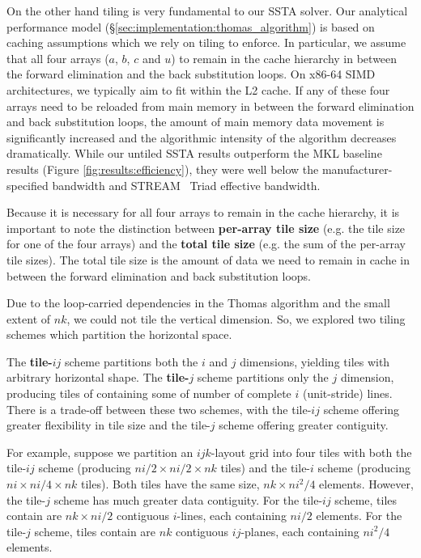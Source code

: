 \documentclass{sig-alternate-05-2015}
\begin{document}
On the other hand tiling is very fundamental to our SSTA solver.
Our analytical performance model (\S\ref{sec:implementation:thomas_algorithm})
  is based on caching assumptions which we rely on tiling to enforce.
In particular, we assume that all four arrays (\(a\), \(b\), \(c\) and \(u\))
  to remain in the cache hierarchy in between the forward elimination and the
  back substitution loops.
On x86-64 SIMD architectures, we typically aim to fit within the L2 cache.
If any of these four arrays need to be reloaded from main memory in between the
  forward elimination and back substitution loops, the amount of main memory data
  movement is significantly increased and the algorithmic intensity of the
  algorithm decreases dramatically.
While our untiled SSTA results outperform the MKL baseline results (Figure
  \ref{fig:results:efficiency}), they were well below the manufacturer-specified
  bandwidth and STREAM~\cite{stream} Triad effective bandwidth.

Because it is necessary for all four arrays to remain in the cache hierarchy, 
  it is important to note the distinction between \textbf{per-array tile size}
  (e.g. the tile size for one of the four arrays) and the
  \textbf{total tile size} (e.g. the sum of the per-array tile sizes).
The total tile size is the amount of data we need to remain in cache in between
  the forward elimination and back substitution loops.


Due to the loop-carried dependencies in the Thomas algorithm and the small
  extent of \(nk\), we could not tile the vertical dimension. So, we explored two
  tiling schemes which partition the horizontal space.

The \textbf{tile-\(ij\)} scheme partitions both the \(i\) and \(j\) dimensions,
  yielding tiles with arbitrary horizontal shape. 
The \textbf{tile-\(j\)} scheme partitions only the \(j\) dimension, producing
  tiles of containing some of number of complete \(i\) (unit-stride) lines.
There is a trade-off between these two schemes, with the tile-\(ij\) scheme
  offering greater flexibility in tile size and the tile-\(j\) scheme offering
  greater contiguity. 

For example, suppose we partition an \(ijk\)-layout grid into four tiles with
  both the tile-\(ij\) scheme (producing \(ni/2 \times ni/2 \times nk\) tiles)
  and the tile-\(i\) scheme (producing \(ni \times ni/4 \times nk\) tiles).
Both tiles have the same size, \(nk \times ni^2/4\) elements.
However, the tile-\(j\) scheme has much greater data contiguity.
For the tile-\(ij\) scheme, tiles contain are \(nk \times ni/2\) contiguous
  \(i\)-lines, each containing \(ni/2\) elements.
For the tile-\(j\) scheme, tiles contain are \(nk\) contiguous \(ij\)-planes,
  each containing \(ni^2/4\) elements.
\end{document}
